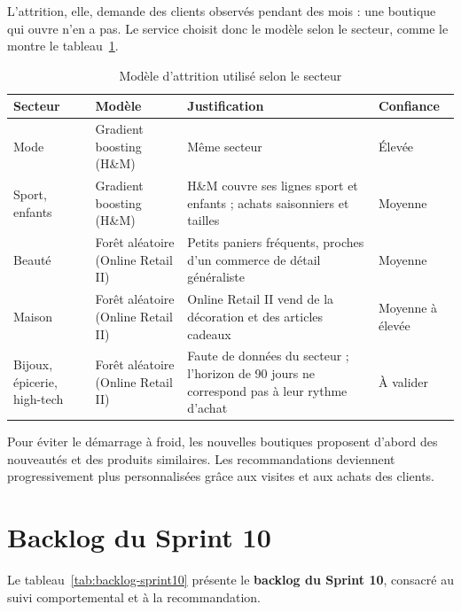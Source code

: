 L'attrition, elle, demande des clients observés pendant des mois : une boutique qui ouvre n'en a pas. Le service choisit donc le modèle selon le secteur, comme le montre le tableau~\ref{tab:churn-secteur}.
\begin{table}[H]
\centering
\renewcommand{\arraystretch}{1.3}
\small
\begin{tabular}{|p{2.4cm}|p{3.2cm}|p{6.2cm}|p{2.6cm}|}
\hline
\textbf{Secteur} & \textbf{Modèle} & \textbf{Justification} & \textbf{Confiance} \\
\hline
Mode & Gradient boosting (H\&M) & Même secteur & Élevée \\
\hline
Sport, enfants & Gradient boosting (H\&M) & H\&M couvre ses lignes sport et enfants ; achats saisonniers et tailles & Moyenne \\
\hline
Beauté & Forêt aléatoire (Online Retail II) & Petits paniers fréquents, proches d'un commerce de détail généraliste & Moyenne \\
\hline
Maison & Forêt aléatoire (Online Retail II) & Online Retail II vend de la décoration et des articles cadeaux & Moyenne à élevée \\
\hline
Bijoux, épicerie, high-tech & Forêt aléatoire (Online Retail II) & Faute de données du secteur ; l'horizon de 90 jours ne correspond pas à leur rythme d'achat & À valider \\
\hline
\end{tabular}
\caption{Modèle d'attrition utilisé selon le secteur}
\label{tab:churn-secteur}
\end{table}


Pour éviter le démarrage à froid, les nouvelles boutiques proposent d'abord des nouveautés et des produits similaires. Les recommandations deviennent progressivement plus personnalisées grâce aux visites et aux achats des clients.



\section{Backlog du Sprint 10}
Le tableau~\ref{tab:backlog-sprint10} présente le \textbf{backlog du Sprint 10}, consacré au suivi comportemental et à la recommandation.

